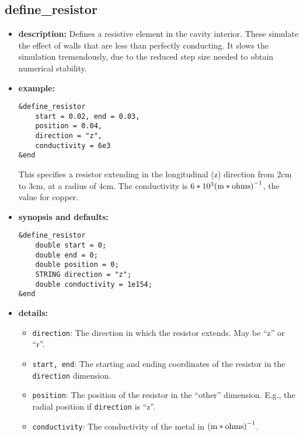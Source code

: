 %
\newpage

\subsection{define\_resistor}

\begin{itemize}

\item {\bf description:}
Defines a resistive element in the cavity interior.  These simulate
the effect of walls that are less than perfectly conducting.  It slows
the simulation tremendously, due to the reduced step size needed to
obtain numerical stability.

\item {\bf example:} 
\begin{verbatim}
&define_resistor
    start = 0.02, end = 0.03,
    position = 0.04, 
    direction = "z",
    conductivity = 6e3
&end
\end{verbatim}
This specifies a resistor extending in the longitudinal (z) direction
from 2cm to 3cm, at a radius of 4cm.  The conductivity is $6*10^3 {\rm
(m*ohms)}^{-1}$, the value for copper.


\item {\bf synopsis and defaults:} 
\begin{verbatim}
&define_resistor
    double start = 0;
    double end = 0;
    double position = 0;
    STRING direction = "z";
    double conductivity = 1e154;
&end
\end{verbatim}

\item {\bf details:} 
\begin{itemize}
    \item {\tt direction}:  The direction in which the resistor extends.
        May be ``z'' or ``r''.
    \item {\tt start, end}: The starting and ending coordinates of the
        resistor in the {\tt direction} dimension.
    \item {\tt position}: The position of the resistor in the ``other''
        dimension.  E.g., the radial position if {\tt direction} is ``z''.
    \item {\tt conductivity}: The conductivity of the metal in ${\rm
(m*ohms)}^{-1}$.

\end{itemize}

\end{itemize}
